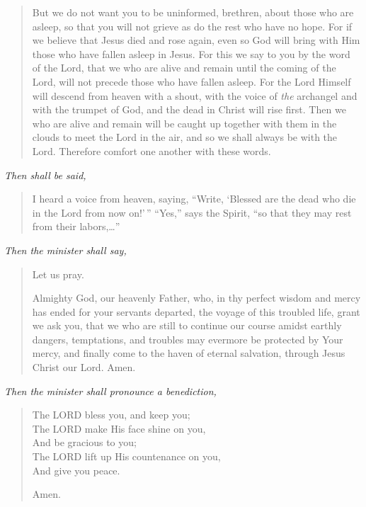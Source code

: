 \documentclass[
]{book}
\begin{document}
\begin{quote}
But we do not want you to be uninformed, brethren, about those who are asleep, so that you will not grieve as do the rest who have no hope. For if we believe that Jesus died and rose again, even so God will bring with Him those who have fallen asleep in Jesus. For this we say to you by the word of the Lord, that we who are alive and remain until the coming of the Lord, will not precede those who have fallen asleep. For the Lord Himself will descend from heaven with a shout, with the voice of \emph{the} archangel and with the trumpet of God, and the dead in Christ will rise first. Then we who are alive and remain will be caught up together with them in the clouds to meet the Lord in the air, and so we shall always be with the Lord. Therefore comfort one another with these words.
\end{quote}

\begin{center}
\emph{Then shall be said,}

\end{center}

\begin{quote}
I heard a voice from heaven, saying, ``Write, `Blessed are the dead who die in the Lord from now on!'\,'' ``Yes,'' says the Spirit, ``so that they may rest from their labors,\ldots{}''
\end{quote}

\begin{center}
\emph{Then the minister shall say,}

\end{center}

\begin{quote}
Let us pray.

Almighty God, our heavenly Father, who, in thy perfect wisdom and mercy has ended for your servants departed, the voyage of this troubled life, grant we ask you, that we who are still to continue our course amidst earthly dangers, temptations, and troubles may evermore be protected by Your mercy, and finally come to the haven of eternal salvation, through Jesus Christ our Lord. Amen.
\end{quote}

\begin{center}
\emph{Then the minister shall pronounce a benediction,}

\end{center}

\begin{quote}
The LORD bless you, and keep you;\\
The LORD make His face shine on you,\\
And be gracious to you;\\
The LORD lift up His countenance on you,\\
And give you peace.

Amen.
\end{quote}
\end{document}
